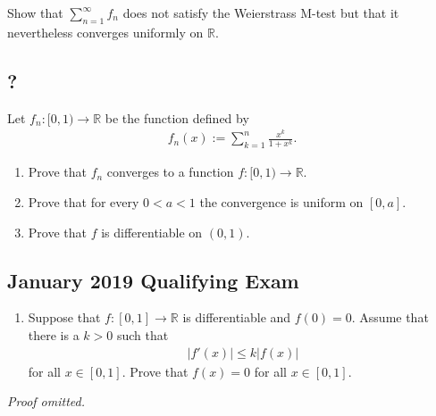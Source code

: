 Show that \(\sum_{n=1}^\infty f_n\) does not satisfy the Weierstrass
M-test but that it nevertheless converges uniformly on \(\mathbb{R}\).

\hypertarget{section-23}{%
\subsection{?}\label{section-23}}

Let \(f_n \colon [0,1) \to \mathbb{R}\) be the function defined by
\begin{align*}f_n(x):= \sum_{k=1}^n \frac{x^k}{1+x^k}.\end{align*}

\begin{enumerate}
\def\labelenumi{\arabic{enumi}.}
\item
  Prove that \(f_n\) converges to a function
  \(f \colon [0,1) \to \mathbb{R}\).
\item
  Prove that for every \(0 < a < 1\) the convergence is uniform on
  \([0,a]\).
\item
  Prove that \(f\) is differentiable on \((0,1)\).
\end{enumerate}

\hypertarget{january-2019-qualifying-exam}{%
\subsection*{January 2019 Qualifying
Exam}\label{january-2019-qualifying-exam}}

\begin{enumerate}
\def\labelenumi{\arabic{enumi}.}
\tightlist
\item
  Suppose that \(f: [0,1] \to \mathbb{R}\) is differentiable and
  \(f(0) = 0\). Assume that there is a \(k > 0\) such that
  \begin{align*}|f'(x)| \leq k|f(x)|\end{align*}
  for all \(x\in [0,1]\). Prove that \(f(x) = 0\) for all
  \(x\in [0,1]\).
\end{enumerate}

\emph{Proof omitted.}



\newpage
\printbibliography[title=Bibliography]



